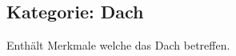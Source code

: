 \documentclass{article}
\newcommand{\mml}[1]{\texttt{#1}}
\newcommand{\merkmal}[2]{\subsubsection{\mml{#1}}\label{merkmal:#1}\index{\category! #1}\begin{description}#2\end{description}\medskip}
\newcommand{\erlaeuterung}[1]{\item[Erläuterung]:\\ #1 }
\newcommand{\wert}[1]{\item[Wert]:\\ #1 }
\newcommand{\beispiel}[1]{\item[Beispiele]:\\ #1 }
\newcommand{\rechtsmaterie}[1]{\item[Rechtsmaterie]:  \\#1 }
\newcommand{\notiz}[1]{\item[Bemerkungen]:  \\#1 }
\newcommand{\quelle}[1]{\inVersion{long}{\item[Quelle]: \\#1 }}
\newcommand{\frage}[1]{\inVersion{long}{\item[{\color{red}Frage}]: \\#1 }}
\newcommand{\merkmalref}[1]{\hyperref[merkmal:#1]{\mml{#1}}}
\newcommand{\etc}{{[\dots]}}
\newcommand{\category}{none}
\newcommand{\versionlength}{short}
\newcommand{\inVersion}[2]{\ifdefstring{\versionlength}{#1}{#2}{
\ifdefstring{\versionlength}{all}{\noindent \textbf{In #1 Version: }
  #2 \textbf{End of  #1 Version}\\}{}
}}
\begin{document}







\subsection{Kategorie: Dach}
\label{sec:kategorie:dach}

\renewcommand{\category}{Dach}

Enthält Merkmale welche das Dach betreffen.

\end{document}
